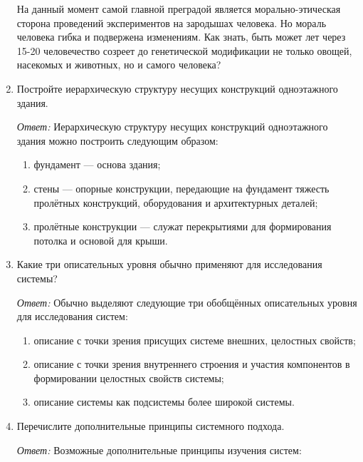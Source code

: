\documentclass[10pt]{article}
\begin{document}
\begin{enumerate}
  На данный момент самой главной преградой является морально-этическая сторона проведений экспериментов на зародышах человека. Но мораль человека гибка и подвержена изменениям. Как знать, быть может лет через 15-20 человечество созреет до генетической модификации не только овощей, насекомых и животных, но и самого человека?

\item{Постройте иерархическую структуру несущих конструкций одноэтажного здания.}
  
  \emph{Ответ:} Иерархическую структуру несущих конструкций одноэтажного здания можно построить следующим образом:
  \begin{enumerate}
  \item{фундамент --- основа здания;}
  \item{стены --- опорные конструкции, передающие на фундамент тяжесть пролётных конструкций, оборудования и архитектурных деталей;}
  \item{пролётные конструкции --- служат перекрытиями для формирования потолка и основой для крыши.}
  \end{enumerate}


\item{Какие три описательных уровня обычно применяют для исследования системы?}

  \emph{Ответ:} Обычно выделяют следующие три обобщённых описательных уровня для исследования систем:

  \begin{enumerate}
  \item{описание с точки зрения присущих системе внешних, целостных свойств;}
  \item{описание с точки зрения внутреннего строения и участия компонентов в формировании целостных свойств системы;}
  \item{описание системы как подсистемы более широкой системы.}
  \end{enumerate}

\item{Перечислите дополнительные принципы системного подхода.}

  \emph{Ответ:} Возможные дополнительные принципы изучения систем:


\end{enumerate}
\end{document}
